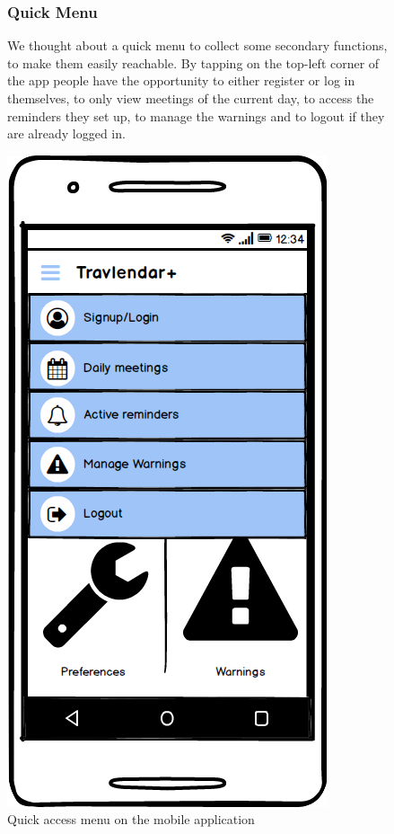 	\begin{figure}
			\begin{flushleft}
			
			
\subsubsection{Quick Menu}
			We thought about a quick menu to collect some secondary functions, to make them easily reachable. By tapping on the top-left corner of the app people have the opportunity to either register or log in themselves, to only view meetings of the current day, to access the reminders they set up, to manage the warnings and to logout if they are already logged in.
		\end{flushleft}
	\centering
	\includegraphics[width=0.6\linewidth]{mockups/QuickMenu}
	\caption{Quick access menu on the mobile application}
	\label{fig:quickmenu}
	\end{figure}
\clearpage

